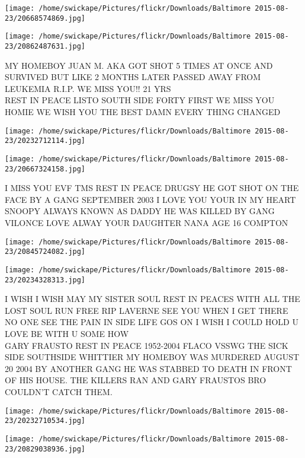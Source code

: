 \documentclass[10pt,letterpaper]{article}
\begin{document}
\texttt{[image: /home/swickape/Pictures/flickr/Downloads/Baltimore 2015-08-23/20668574869.jpg]}

\vspace{0.25in}
\texttt{[image: /home/swickape/Pictures/flickr/Downloads/Baltimore 2015-08-23/20862487631.jpg]}

MY HOMEBOY JUAN M. AKA GOT SHOT 5 TIMES AT ONCE AND SURVIVED BUT LIKE 2 MONTHS LATER PASSED AWAY FROM LEUKEMIA R.I.P. WE MISS YOU!!  21 YRS\\
REST IN PEACE LISTO SOUTH SIDE FORTY FIRST WE MISS YOU HOMIE WE WISH YOU THE BEST DAMN EVERY THING CHANGED
\pagebreak

\texttt{[image: /home/swickape/Pictures/flickr/Downloads/Baltimore 2015-08-23/20232712114.jpg]}

\vspace{0.25in}
\texttt{[image: /home/swickape/Pictures/flickr/Downloads/Baltimore 2015-08-23/20667324158.jpg]}

I MISS YOU EVF TMS REST IN PEACE DRUGSY HE GOT SHOT ON THE FACE BY A GANG SEPTEMBER 2003 I LOVE YOU YOUR IN MY HEART\\
SNOOPY ALWAYS KNOWN AS DADDY HE WAS KILLED BY GANG VILONCE LOVE ALWAY YOUR DAUGHTER NANA AGE 16 COMPTON
\pagebreak

\texttt{[image: /home/swickape/Pictures/flickr/Downloads/Baltimore 2015-08-23/20845724082.jpg]}

\vspace{0.25in}
\texttt{[image: /home/swickape/Pictures/flickr/Downloads/Baltimore 2015-08-23/20234328313.jpg]}

I WISH I WISH MAY MY SISTER SOUL REST IN PEACES WITH ALL THE LOST SOUL RUN FREE RIP LAVERNE SEE YOU WHEN I GET THERE NO ONE SEE THE PAIN IN SIDE LIFE GOS ON I WISH I COULD HOLD U LOVE BE WITH U SOME HOW\\
GARY FRAUSTO REST IN PEACE 1952{-}2004 FLACO VSSWG THE SICK SIDE SOUTHSIDE WHITTIER MY HOMEBOY WAS MURDERED AUGUST 20 2004 BY ANOTHER GANG HE WAS STABBED TO DEATH IN FRONT OF HIS HOUSE.  THE KILLERS RAN AND GARY FRAUSTOS BRO COULDN'T CATCH THEM.
\pagebreak

\texttt{[image: /home/swickape/Pictures/flickr/Downloads/Baltimore 2015-08-23/20232710534.jpg]}

\vspace{0.25in}
\texttt{[image: /home/swickape/Pictures/flickr/Downloads/Baltimore 2015-08-23/20829038936.jpg]}
\end{document}
